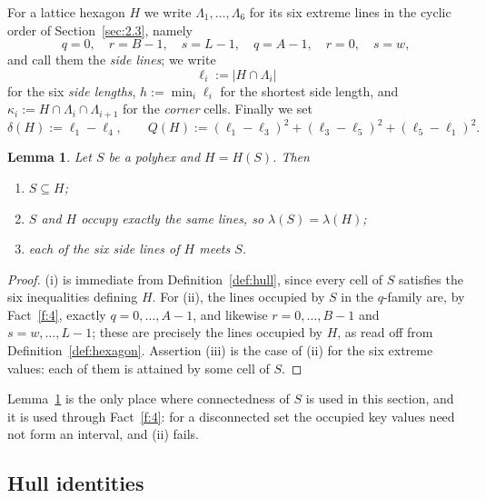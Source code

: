 \documentclass[11pt]{article}
\theoremstyle{plain}
\newtheorem{lemma}[theorem]{Lemma}
\theoremstyle{definition}
\theoremstyle{remark}
\begin{document}
For a lattice hexagon \(H\) we write \(\Lambda_{1},\dots,\Lambda_{6}\) for its six extreme
lines in the cyclic order of Section~\ref{sec:2.3}, namely
\[
   q=0,\quad r=B-1,\quad s=L-1,\quad q=A-1,\quad r=0,\quad s=w ,
\]
and call them the \emph{side lines}; we write
\[
   \ell_{i}:=|H\cap\Lambda_{i}|
\]
for the six \emph{side lengths}, \(h:=\min_{i}\ell_{i}\) for the shortest side length, and
\(\kappa_{i}:=H\cap\Lambda_{i}\cap\Lambda_{i+1}\) for the \emph{corner} cells. Finally we
set
\[
   \delta(H):=\ell_{1}-\ell_{4},
   \qquad
   Q(H):=(\ell_{1}-\ell_{3})^{2}+(\ell_{3}-\ell_{5})^{2}+(\ell_{5}-\ell_{1})^{2} .
\]

\begin{lemma}\label{lem:hull}
Let \(S\) be a polyhex and \(H=H(S)\). Then
\begin{enumerate}
\item[(i)] \(S\subseteq H\);
\item[(ii)] \(S\) and \(H\) occupy exactly the same lines, so \(\lambda(S)=\lambda(H)\);
\item[(iii)] each of the six side lines of \(H\) meets \(S\).
\end{enumerate}
\end{lemma}

\begin{proof}
(i) is immediate from Definition~\ref{def:hull}, since every cell of \(S\) satisfies the
six inequalities defining \(H\). For (ii), the lines occupied by \(S\) in the \(q\)-family
are, by Fact~\ref{f:4}, exactly \(q=0,\dots,A-1\), and likewise \(r=0,\dots,B-1\) and
\(s=w,\dots,L-1\); these are precisely the lines occupied by \(H\), as read off from
Definition~\ref{def:hexagon}. Assertion (iii) is the case of (ii) for the six extreme
values: each of them is attained by some cell of \(S\).
\end{proof}

Lemma~\ref{lem:hull} is the only place where connectedness of \(S\) is used in this
section, and it is used through Fact~\ref{f:4}: for a disconnected set the occupied key
values need not form an interval, and (ii) fails.

\subsection{Hull identities}\label{sec:2.5}
\end{document}
